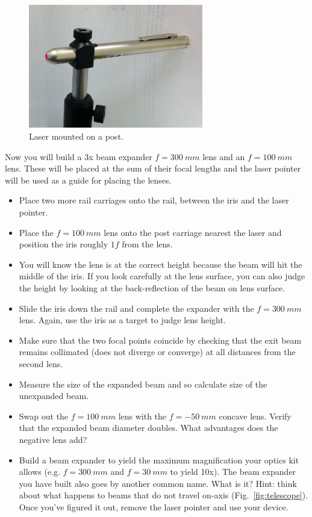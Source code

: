 \documentclass[a4paper]{report}
\begin{document}
\begin{figure}[h]
\center
\includegraphics[width=3in]{mounted_laser.eps}
\caption{Laser mounted on a post.}
\label{fig:mounted_laser}
\end{figure}


Now you will build a 3x beam expander $f=300~mm$ lens and an $f=100~mm$ lens. 
These will be placed at the sum of their focal lengths and the laser pointer will be used as a guide for placing the lenses. 

\begin{itemize}
\item Place two more rail carriages onto the rail, between the iris and the laser pointer. 
\item Place the $f=100~mm$ lens onto the post carriage nearest the laser and position the iris roughly $1f$ from the lens.
\item You will know the lens is at the correct height because the beam will hit the middle of the iris. 
If you look carefully at the lens surface, you can also judge the height by looking at the back-reflection of the beam on lens surface. 
\item Slide the iris down the rail and complete the expander with the $f=300~mm$ lens. Again, use the iris as a target to judge lens height.
\item Make sure that the two focal points coincide by checking that the exit beam remains collimated (does not diverge or converge)
at all distances from the second lens. 
\item Measure the size of the expanded beam and so calculate size of the unexpanded beam.
\item Swap out the $f=100~mm$ lens with the $f=-50~mm$ concave lens. Verify that the expanded beam diameter doubles. 
What advantages does the negative lens add?
\item Build a beam expander to yield the maximum magnification your optics kit allows (e.g. $f=300~mm$ and $f=30~mm$ to yield 10x). 
The beam expander you have built also goes by another common name.  What is it? 
Hint: think about what happens to beams that do not travel on-axis (Fig.~\ref{fig:telescope}).
Once you've figured it out, remove the laser pointer and use your device. 
\end{itemize}
\end{document}
